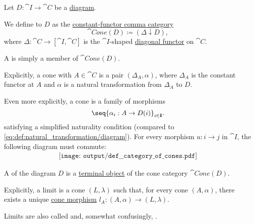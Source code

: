 \begin{definition}\label{def:category_of_cones}
  Let \( D: \cat{I} \to \cat{C} \) be a \hyperref[def:categorical_diagram]{diagram}.

  \begin{thmenum}
     We define  to \( D \) as the \hyperref[def:comma_category/fixed]{constant-functor comma category}
    \begin{equation*}
      \cat{Cone}(D) \coloneqq (\Delta \downarrow D),
    \end{equation*}
    where \( \Delta: \cat{C} \to [\cat{I}, \cat{C}] \) is the \( \cat{I} \)-shaped \hyperref[def:diagonal_functor]{diagonal functor} on \( \cat{C} \).

     A  is simply a member of \( \cat{Cone}(D) \).

    Explicitly, a cone with  \( A \in \cat{C} \) is a pair \( (\Delta_A, \alpha) \), where \( \Delta_A \) is the constant functor at \( A \) and \( \alpha \) is a natural transformation from \( \Delta_A \) to \( D \).

    Even more explicitly, a cone is a family of morphisms
    \begin{equation}\label{eq:def:category_of_cones/cone}
      \seq{ \alpha_i: A \to D(i) }_{i \in \cat{I}}.
    \end{equation}
    satisfying a simplified naturality condition (compared to \eqref{eq:def:natural_transformation/diagram}). For every morphism \( u: i \to j \) in \( \cat{I} \), the following diagram must commute:
    \begin{equation}\label{eq:def:category_of_cones/cone_nat}
      \begin{aligned}
        \texttt{[image: output/def\_\_category\_of\_cones.pdf]}
      \end{aligned}
    \end{equation}

     A  of the diagram \( D \) is a \hyperref[def:universal_objects/terminal]{terminal object} of the cone category \( \cat{Cone}(D) \).

    Explicitly, a limit is a cone \( (L, \lambda) \) such that, for every cone \( (A, \alpha) \), there exists a unique \hyperref[eq:def:comma_category/fixed]{cone morphism} \( l_A: (A, \alpha) \to (L, \lambda) \).

    Limits are also called  and, somewhat confusingly, .


\end{thmenum}
\end{definition}
